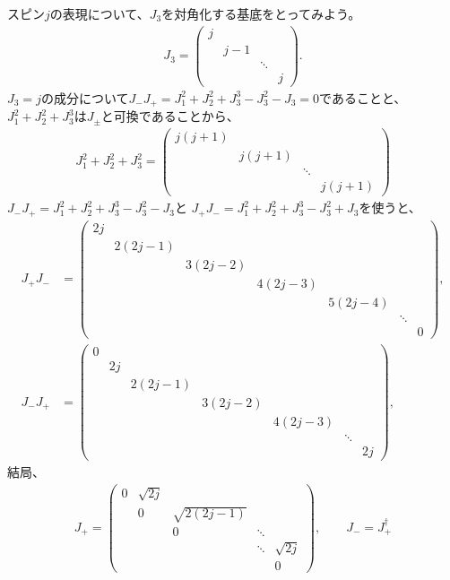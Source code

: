 \documentclass[10pt,a4paper]{jarticle}
\begin{document}
スピン$j$の表現について、$J_3$を対角化する基底をとってみよう。
\begin{align}
J_3 = \left(\begin{array}{cccc}
j &&& \\
& j-1 && \\
&& \ddots & \\
&&& j
\end{array}\right).
\end{align}
%
$J_3 = j$の成分について$J_- J_+ = J_1^2 + J_2^2 + J_3^3 - J_3^2 - J_3 = 0$であることと、
$J_1^2 + J_2^2 + J_3^3$は$J_\pm$と可換であることから、
\begin{align}
J_1^2+J_2^2+J_3^2 = \left(\begin{array}{cccc}
j(j+1) &&& \\
& j(j+1) && \\
&& \ddots & \\
&&& j(j+1)
\end{array}\right)
\end{align}
%
$J_- J_+ = J_1^2 + J_2^2 + J_3^3 - J_3^2 - J_3$と
$J_+ J_- = J_1^2 + J_2^2 + J_3^3 - J_3^2 + J_3$を使うと、
\begin{align}
J_+ J_-
& = \left(\begin{array}{ccccccc}
 2j &&&&&& \\
& 2(2j-1) &&&&& \\
&& 3(2j-2) &&&& \\
&&& 4(2j-3) &&& \\
&&&& 5(2j-4) && \\
&&&&& \ddots & \\
&&&&&& 0
\end{array}\right), \\
%
J_- J_+
& = \left(\begin{array}{ccccccc}
0 &&&&&& \\
& 2j &&&&& \\
&& 2(2j-1) &&&& \\
&&& 3(2j-2) &&& \\
&&&& 4(2j-3) && \\
&&&&& \ddots & \\
&&&&&& 2j
\end{array}\right), \quad
\end{align}
%
結局、
\begin{align}
J_+ = \left(\begin{array}{ccccc}
0& \sqrt{2j} &&& \\
&0& \sqrt{2(2j-1)} && \\
&&0& \ddots & \\
&&&\ddots& \sqrt{2j} \\
&&&&0
\end{array}\right), \qquad
J_- = J_+^\dagger
\end{align}
\end{document}
